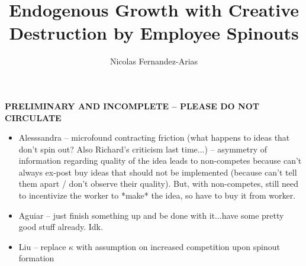 \documentclass[12pt,english]{article}
\theoremstyle{remark}
\begin{document}
	
\title{Endogenous Growth with Creative Destruction by Employee Spinouts}
\author{Nicolas Fernandez-Arias}
\maketitle


\textbf{PRELIMINARY AND INCOMPLETE -- PLEASE DO NOT CIRCULATE}

\begin{itemize}
	\item Alesssandra -- microfound contracting friction (what happens to ideas that don't spin out? Also Richard's criticism last time...) -- asymmetry of information regarding quality of the idea leads to non-competes because can't always ex-post buy ideas that should not be implemented (because can't tell them apart / don't observe their quality). But, with non-competes, still need to incentivize the worker to *make* the idea, so have to buy it from worker. 
	\item Aguiar -- just finish something up and be done with it...have some pretty good stuff already. Idk.
	\item Liu -- replace $\kappa$ with assumption on increased competition upon spinout formation
\end{itemize}
\end{document}
